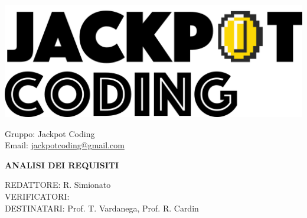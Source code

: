 \documentclass[5pt]{article}
\begin{document}
\begin{minipage}[t]{0.50\textwidth}
    \begin{flushleft}
        \hspace{10pt}
        \includegraphics[scale=0.65]{jackpot-logo.png} 
    \end{flushleft}
\end{minipage}
\hspace{-60pt} %
\begin{flushright}
    \begin{minipage}[t]{0.50\textwidth}
        \begin{flushright}
            Gruppo: {\Large Jackpot Coding}\\
            Email: \href{mailto:jackpotcoding@gmail.com}{jackpotcoding@gmail.com}
        \end{flushright}
    \end{minipage}
\end{flushright}

\vspace{24pt}

\begin{center}
    \textbf{\LARGE ANALISI DEI REQUISITI}
\end{center}

\vspace{13pt}

\begin{flushleft}
    \begin{spacing}{1.5}
        REDATTORE: R. Simionato\\%
        VERIFICATORI: \\
        \vspace{7pt}
        DESTINATARI: Prof. T. Vardanega, Prof. R. Cardin\\%
    \end{spacing}
\end{flushleft}
\end{document}
